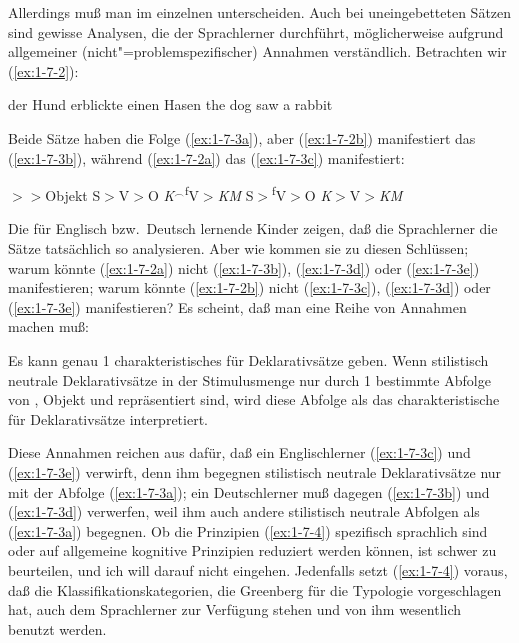 \documentclass[output=paper]{langsci/langscibook}
\begin{document}
Allerdings muß man im einzelnen unterscheiden. Auch bei uneingebetteten
Sätzen sind gewisse Analysen, die der Sprachlerner durchführt, möglicherweise aufgrund allgemeiner (nicht"=problemspezifischer) Annahmen verständlich. Betrachten
wir (\ref{ex:1-7-2}):
\begin{exe}
\ex\label{ex:1-7-2}
\begin{xlist}
\ex\label{ex:1-7-2a} der Hund erblickte einen Hasen
\ex\label{ex:1-7-2b} the dog saw a rabbit
\end{xlist}
\end{exe}
Beide Sätze haben die Folge (\ref{ex:1-7-3a}), aber (\ref{ex:1-7-2b}) manifestiert das  (\ref{ex:1-7-3b}), während
(\ref{ex:1-7-2a}) das  (\ref{ex:1-7-3c}) manifestiert:
\begin{exe}
\ex\label{ex:1-7-3}
\begin{xlist}
\ex\label{ex:1-7-3a} $>$$>$Objekt
\ex\label{ex:1-7-3b} S$>$V$>$O
\ex\label{ex:1-7-3c} \textit{K}$^{\smallfrown}$\textsuperscript{f}V$>$\textit{KM}
\ex\label{ex:1-7-3d} S$>$\textsuperscript{f}V$>$O
\ex\label{ex:1-7-3e} \textit{K}$>$V$>$\textit{KM}
\end{xlist}
\end{exe}
Die  für Englisch bzw.\ Deutsch lernende Kinder zeigen, daß die
Sprachlerner die Sätze tatsächlich so analysieren. Aber wie kommen sie zu diesen
Schlüssen; warum könnte (\ref{ex:1-7-2a}) nicht (\ref{ex:1-7-3b}), (\ref{ex:1-7-3d}) oder (\ref{ex:1-7-3e}) manifestieren; warum könnte
(\ref{ex:1-7-2b}) nicht (\ref{ex:1-7-3c}), (\ref{ex:1-7-3d}) oder (\ref{ex:1-7-3e}) manifestieren?
Es scheint, daß man eine Reihe von Annahmen machen muß:
\begin{exe}
\ex\label{ex:1-7-4}
\begin{xlist}
\ex\label{ex:1-7-4a} Es kann genau 1 charakteristisches  für Deklarativsätze geben.
\ex\label{ex:1-7-4b} Wenn stilistisch neutrale Deklarativsätze in der Stimulusmenge nur durch 1 bestimmte Abfolge von , Objekt und  repräsentiert sind, wird
diese Abfolge als das charakteristische  für Deklarativsätze interpretiert.
\end{xlist}
\end{exe}
Diese Annahmen reichen aus dafür, daß ein Englischlerner (\ref{ex:1-7-3c}) und (\ref{ex:1-7-3e}) verwirft,
denn ihm begegnen stilistisch neutrale Deklarativsätze nur mit der Abfolge (\ref{ex:1-7-3a}); ein
Deutschlerner muß dagegen (\ref{ex:1-7-3b}) und (\ref{ex:1-7-3d}) verwerfen, weil ihm auch andere stilistisch neutrale Abfolgen als (\ref{ex:1-7-3a}) begegnen. Ob die Prinzipien (\ref{ex:1-7-4}) spezifisch sprachlich sind oder auf allgemeine kognitive Prinzipien reduziert werden können, ist schwer zu beurteilen, und ich will darauf nicht eingehen. Jedenfalls setzt (\ref{ex:1-7-4}) voraus, daß die Klassifikationskategorien, die Greenberg für die Typologie vorgeschlagen hat, auch dem
Sprachlerner zur Verfügung stehen und von ihm wesentlich benutzt werden.
\end{document}
